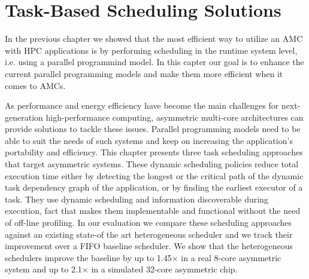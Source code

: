 \chapter{Task-Based Scheduling Solutions}
\label{chapter.scheduling}
In the previous chapter we showed that the most efficient way to utilize an AMC with HPC applications is by performing scheduling in the runtime system level, i.e. using a parallel programmind model.
In this capter our goal is to enhance the current parallel programming models and make them more efficient when it comes to AMCs.

As performance and energy efficiency have become the main challenges for next-generation high-performance computing, asymmetric multi-core architectures can provide solutions to tackle these issues.
Parallel programming models need to be able to suit the needs of such systems and keep on increasing the application's portability and efficiency.
This chapter presents three task scheduling approaches that target asymmetric systems.
These dynamic scheduling policies reduce total execution time either by detecting the longest or the critical path of the dynamic task dependency graph of the application, or by finding the earliest executor of a task.
They use dynamic scheduling and information discoverable during execution, fact that makes them implementable and functional without the need of off-line profiling.
In our evaluation we compare these scheduling approaches against an existing state-of the art heterogeneous scheduler and we track their improvement over a FIFO baseline scheduler.
We show that the heterogeneous schedulers improve the baseline by up to 1.45$\times$ in a real 8-core asymmetric system and up to 2.1$\times$ in a simulated 32-core asymmetric chip.

\newpage





%



%





